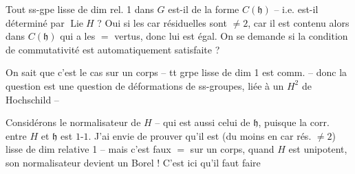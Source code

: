 Tout ss-gpe lisse  de  dim rel. 1 dans $G$ est-il de la forme $C(\mathfrak h)$ -- i.e. est-il déterminé par $\operatorname{Lie}H$ ? Oui  si les car résiduelles sont $\ne2$, car il est contenu alors dans $C(\mathfrak h)$ qui a les $=$ vertus, donc lui est égal. On se demande si la condition de commutativité est automatiquement satisfaite ?

  On sait que c'est le cas sur un corps -- tt grpe lisse  de dim 1 est comm. -- donc la question est une question de déformations de ss-groupes, liée à un $H^2$ de Hochschild --

Considérons le normalisateur de $H$ -- qui est aussi celui de $\mathfrak h$, puisque la corr. entre $H$ et $\mathfrak h$ est $1$-$1$. J'ai envie de prouver qu'il est (du moins en car rés. $\ne2$) lisse de dim relative 1 -- mais c'est faux $=$ sur un corps, quand $H$ est unipotent, son normalisateur devient un Borel ! C'est ici qu'il faut faire 
